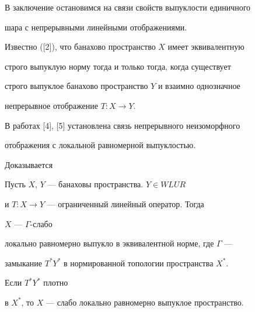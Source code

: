  


В заключение остановимся на связи свойств выпуклости единичного 


шара с непрерывными линейными отображениями. 


 


Известно ([2]), что банахово пространство $X$ имеет эквивалентную 


строго выпуклую норму тогда и только тогда, когда существует 


строго выпуклое банахово пространство $Y$ и взаимно однозначное 


непрерывное отображение $T:X\to Y$. 


 


В работах [4], [5] установлена связь непрерывного неизоморфного 


отображения с локальной равномерной выпуклостью. 


Доказывается 


 


\begin{thm} Пусть $X$, $Y$ --- банаховы пространства. $Y\in WLUR$ 


и $T:X\to Y$ --- ограниченный линейный оператор. Тогда 


$X$ --- $\Gamma$-слабо 


локально равномерно выпукло в эквивалентной норме, где $\Gamma$ --- 


замыкание $T^*Y^*$ в нормированной топологии пространства $X^*$. 


Если $T^*Y^*$ плотно 


в $X^*$, то $X$ --- слабо локально равномерно выпуклое пространство. 


\end{thm} 


 



